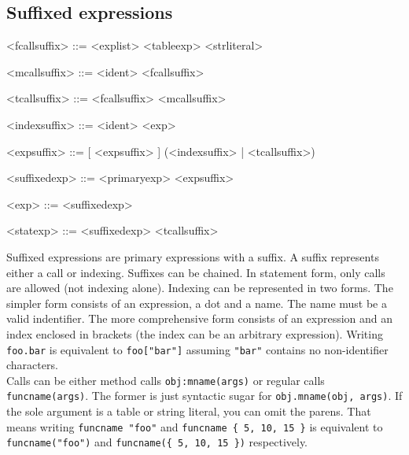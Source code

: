 \documentclass{article}
\newenvironment{bnf}
{
\begin{mdframed}
\begin{grammar}
}
{
\end{grammar}
\end{mdframed}
}
\begin{document}
\subsection{Suffixed expressions}
\begin{bnf}
<fcallsuffix> ::= \lit{(} <explist> \lit{)}
    \alt <tableexp>
    \alt <strliteral>

<mcallsuffix> ::= \lit{:} <ident> <fcallsuffix>

<tcallsuffix> ::= <fcallsuffix>
    \alt <mcallsuffix>

<indexsuffix> ::=  <ident>
    \alt \lit{[} <exp> \lit{]}

<expsuffix> ::= [ <expsuffix> ] (<indexsuffix> | <tcallsuffix>)

<suffixedexp> ::= <primaryexp> <expsuffix>

<exp> ::= <suffixedexp>

<statexp> ::= <suffixedexp> <tcallsuffix>
\end{bnf}
Suffixed expressions are primary expressions with a suffix. A suffix
represents either a call or indexing. Suffixes can be chained. In statement
form, only calls are allowed (not indexing alone). Indexing can be represented
in two forms. The simpler form consists of an expression, a dot and a name.
The name must be a valid indentifier. The more comprehensive form consists
of an expression and an index enclosed in brackets (the index can be an
arbitrary expression). Writing \verb|foo.bar| is equivalent to
\verb|foo["bar"]| assuming \verb|"bar"| contains no non-identifier
characters.\\
Calls can be either method calls \verb|obj:mname(args)| or regular
calls \verb|funcname(args)|. The former is just syntactic sugar for
\verb|obj.mname(obj, args)|. If the sole argument is a table or string literal,
you can omit the parens. That means writing \verb|funcname "foo"| and
\verb|funcname { 5, 10, 15 }| is equivalent to \verb|funcname("foo")| and
\verb|funcname({ 5, 10, 15 })| respectively.
\end{document}

